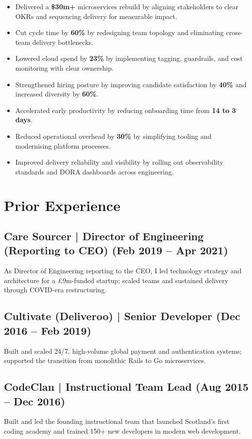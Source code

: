 \documentclass[12pt]{article}
\begin{document}
\begin{itemize}
  \item Delivered a \textbf{\$30m+} microservices rebuild by aligning stakeholders to clear OKRs and sequencing delivery for measurable impact.
  \item Cut cycle time by \textbf{60\%} by redesigning team topology and eliminating cross-team delivery bottlenecks.
  \item Lowered cloud spend by \textbf{23\%} by implementing tagging, guardrails, and cost monitoring with clear ownership.
  \item Strengthened hiring posture by improving candidate satisfaction by \textbf{40\%} and increased diversity by \textbf{60\%}.
  \item Accelerated early productivity by reducing onboarding time from \textbf{14 to 3 days}.
  \item Reduced operational overhead by \textbf{30\%} by simplifying tooling and modernising platform processes.
  \item Improved delivery reliability and visibility by rolling out observability standards and DORA dashboards across engineering.
\end{itemize}

\section*{Prior Experience}

\subsection*{Care Sourcer | Director of Engineering (Reporting to CEO) \small (Feb 2019 -- Apr 2021)}
As Director of Engineering reporting to the CEO, I led technology strategy and architecture for a \pounds9m-funded startup; scaled teams and sustained delivery through COVID-era restructuring.

\subsection*{Cultivate (Deliveroo) | Senior Developer \small (Dec 2016 -- Feb 2019)}
Built and scaled 24/7, high-volume global payment and authentication systems; supported the transition from monolithic Rails to Go microservices.

\subsection*{CodeClan | Instructional Team Lead \small (Aug 2015 -- Dec 2016)}
Built and led the founding instructional team that launched Scotland's first coding academy and trained 150+ new developers in modern web development.
\end{document}
